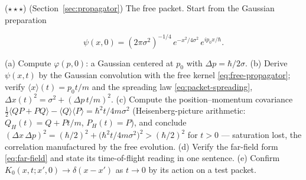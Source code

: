 \begin{problemset}
\item ($\star\star\star$) (Section~\ref{sec:propagator}) The free packet. Start from the Gaussian preparation
\begin{linenomath}
    \begin{equation*}
        \psi(x, 0) = (2\pi\sigma^2)^{-1/4}\,e^{-x^2/4\sigma^2}\,e^{ip_0 x/\hbar} .
    \end{equation*}
\end{linenomath}
(a) Compute $\varphi(p, 0)$: a Gaussian centered at $p_0$ with $\Delta p = \hbar/2\sigma$. (b) Derive $\psi(x, t)$ by the Gaussian convolution with the free kernel \eqref{eq:free-propagator}; verify $\langle x\rangle(t) = p_0 t/m$ and the spreading law \eqref{eq:packet-spreading}, $\Delta x(t)^2 = \sigma^2 + (\Delta p\,t/m)^2$. (c) Compute the position--momentum covariance $\tfrac12\langle QP + PQ\rangle - \langle Q\rangle\langle P\rangle = \hbar^2 t/4m\sigma^2$ (Heisenberg-picture arithmetic: $Q_H(t) = Q + Pt/m$, $P_H(t) = P$), and conclude $(\Delta x\,\Delta p)^2 = (\hbar/2)^2 + \bigl(\hbar^2 t/4m\sigma^2\bigr)^2 > (\hbar/2)^2$ for $t > 0$ --- saturation lost, the correlation manufactured by the free evolution. (d) Verify the far-field form \eqref{eq:far-field} and state its time-of-flight reading in one sentence. (e) Confirm $K_0(x, t; x', 0) \to \delta(x - x')$ as $t \to 0$ by its action on a test packet.
\end{problemset}
